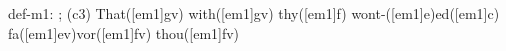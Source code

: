 def-m1: \grealign;
(c3) That([em1]gv) with([em1]gv) thy([em1]f) wont-([em1]e)ed([em1]c) fa([em1]ev)vor([em1]fv) thou([em1]fv)